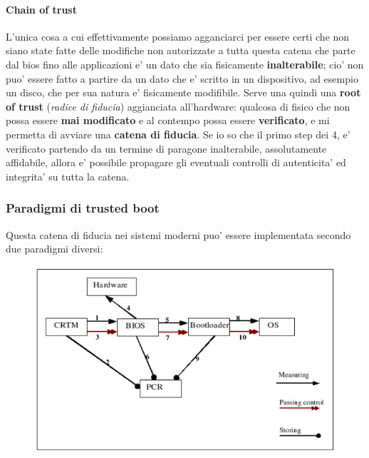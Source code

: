 \paragraph{Chain of trust}
L'unica cosa a cui effettivamente possiamo agganciarci per essere certi che non siano state fatte delle modifiche non autorizzate a tutta questa catena che parte dal bios fino alle applicazioni e' un dato che sia fisicamente \textbf{inalterabile}; cio' non puo' essere fatto a partire da un dato che e' scritto in un dispositivo, ad esempio un disco, che per sua natura e' fisicamente modifibile. Serve una quindi una \textbf{root of trust} (\emph{radice di fiducia}) aggianciata all'hardware: qualcosa di fisico che non possa essere \textbf{mai modificato} e al contempo possa essere \textbf{verificato}, e mi permetta di avviare una \textbf{catena di fiducia}. Se io so che il primo step dei 4, e' verificato partendo da un termine di paragone inalterabile, assolutamente affidabile, allora e' possibile propagare gli eventuali controlli di autenticita' ed integrita' su tutta la catena.

\subsubsection{Paradigmi di trusted boot}
Questa catena di fiducia nei sistemi moderni puo' essere implementata secondo due paradigmi diversi:

\begin{figure}
	\centering
	\includegraphics[scale=0.5]{img/trustedboot.png}
\end{figure}
